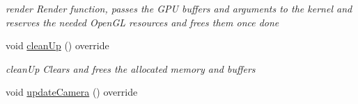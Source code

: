 \begin{DoxyCompactItemize}
\begin{DoxyCompactList}\small\item\em render Render function, passes the G\-P\-U buffers and arguments to the kernel and reserves the needed Open\-G\-L resources and frees them once done \end{DoxyCompactList}\item 
\hypertarget{classvRendererCuda_afa14d96fa05a162a51f8d644cdd1ed1f}{void \hyperlink{classvRendererCuda_afa14d96fa05a162a51f8d644cdd1ed1f}{clean\-Up} () override}\label{classvRendererCuda_afa14d96fa05a162a51f8d644cdd1ed1f}

\begin{DoxyCompactList}\small\item\em clean\-Up Clears and frees the allocated memory and buffers \end{DoxyCompactList}\item 
\hypertarget{classvRendererCuda_a07f5dc38a31d3d165192e85543fb1781}{void \hyperlink{classvRendererCuda_a07f5dc38a31d3d165192e85543fb1781}{update\-Camera} () override}\label{classvRendererCuda_a07f5dc38a31d3d165192e85543fb1781}


\end{DoxyCompactItemize}
